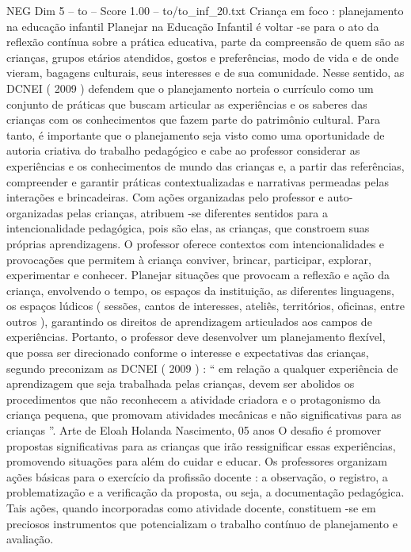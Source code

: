 \begin{textsample}{NEG Dim 5 – to – Score 1.00 – to/to\_inf\_20.txt}  \label{ex:f5_neg_269}
Criança em foco : planejamento na educação infantil Planejar na Educação Infantil é voltar -se para o ato da reflexão contínua sobre a prática educativa, parte da compreensão de quem são as crianças, grupos etários atendidos, gostos e preferências, modo de vida e de onde vieram, bagagens culturais, seus interesses e de sua comunidade.
Nesse sentido, as DCNEI ( 2009 ) defendem que o planejamento norteia o currículo como um conjunto de práticas que buscam articular as experiências e os saberes das crianças com os conhecimentos que fazem parte do patrimônio cultural.
Para tanto, é importante que o planejamento seja visto como uma oportunidade de autoria criativa do trabalho pedagógico e cabe ao professor considerar as experiências e os conhecimentos de mundo das crianças e, a partir das referências, compreender e garantir práticas contextualizadas e narrativas permeadas pelas interações e brincadeiras.
Com ações organizadas pelo professor e auto-organizadas pelas crianças, atribuem -se diferentes sentidos para a intencionalidade pedagógica, pois são elas, as crianças, que constroem suas próprias aprendizagens.
O professor oferece contextos com intencionalidades e provocações que permitem à criança conviver, brincar, participar, explorar, experimentar e conhecer.
Planejar situações que provocam a reflexão e ação da criança, envolvendo o tempo, os espaços da instituição, as diferentes linguagens, os espaços lúdicos ( sessões, cantos de interesses, ateliês, territórios, oficinas, entre outros ), garantindo os direitos de aprendizagem articulados aos campos de experiências.
Portanto, o professor deve desenvolver um planejamento flexível, que possa ser direcionado conforme o interesse e expectativas das crianças, segundo preconizam as DCNEI ( 2009 ) : “ em relação a qualquer experiência de aprendizagem que seja trabalhada pelas crianças, devem ser abolidos os procedimentos que não reconhecem a atividade criadora e o protagonismo da criança pequena, que promovam atividades mecânicas e não significativas para as crianças ”.
Arte de Eloah Holanda Nascimento, 05 anos O desafio é promover propostas significativas para as crianças que irão ressignificar essas experiências, promovendo situações para além do cuidar e educar.
Os professores organizam ações básicas para o exercício da profissão docente : a observação, o registro, a problematização e a verificação da proposta, ou seja, a documentação pedagógica.
Tais ações, quando incorporadas como atividade docente, constituem -se em preciosos instrumentos que potencializam o trabalho contínuo de planejamento e avaliação.

\end{textsample}
